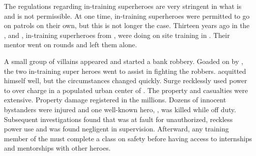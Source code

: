 \documentclass[blue]{LRSguildcamp1}
\begin{document}
\name{\bChicagoIncident{}}

The regulations regarding in-training superheroes are very stringent in what is and is not permissible. At one time, in-training superheroes were permitted to go on patrols on their own, but this is not longer the case. Thirteen years ago in the \pCityO{}, \cYSOldName{} and \cJuggernaut{}, in-training superheroes from \pSuperSchool{}, were doing on site training in \pCityO{}. Their mentor \cOS{\MYsupername} went on rounds and left them alone. 

A small group of villains appeared and started a bank robbery. Goaded on by \cYSOldName{}, the two in-training super heroes went to assist in fighting the robbers. \cJuggernaut{} acquitted himself well, but the circumstances changed quickly. Surge recklessly used \cYS{\their} power to over charge \cJuggernaut{} in a populated urban center of \pCityO{}. The property and casualties were extensive. Property damage registered in the millions. Dozens of innocent bystanders were injured and one well-known hero, \cAS{\MYsupername}, was killed while off duty. Subsequent investigations found that \cYSOldName{} was at fault for unauthorized, reckless power use and \cOS{\MYsupername} was found negligent in supervision. Afterward, any training member of the \cHeroLeague{\intro} must complete a class on safety before having access to internships and mentorships with other heroes. 


\end{document}
